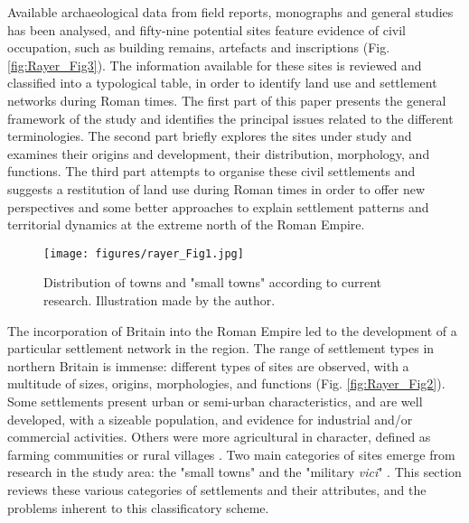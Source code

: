 	Available archaeological data from field reports, monographs and general studies has been analysed, and fifty-nine potential sites feature evidence of civil occupation, such as building remains, artefacts and inscriptions (Fig. \ref{fig:Rayer_Fig3}). The information available for these sites is reviewed and classified into a typological table, in order to identify land use and settlement networks during Roman times. 
The first part of this paper presents the general framework of the study and identifies the principal issues related to the different terminologies. The second part briefly explores the sites under study and examines their origins and development, their distribution, morphology, and functions. The third part attempts to organise these civil settlements and suggests a restitution of land use during Roman times in order to offer new perspectives and some better approaches to explain settlement patterns and territorial dynamics at the extreme north of the Roman Empire.
	
	\begin{figure}
		\texttt{[image: figures/rayer\_Fig1.jpg]}
		\caption{Distribution of towns and "small towns" according to current research. Illustration made by the author.}
		\label{fig:Rayer_Fig1}
	\end{figure}


The incorporation of Britain into the Roman Empire led to the development of a particular settlement network in the region. The range of settlement types in northern Britain is immense: different types of sites are observed, with a multitude of sizes, origins, morphologies, and functions (Fig. \ref{fig:Rayer_Fig2}). Some settlements present urban or semi-urban characteristics, and are well developed, with a sizeable population, and evidence for industrial and/or commercial activities. Others were more agricultural in character, defined as farming communities or rural villages \parencites{Hingley_1989}{James_2001}{Jones_1991}{Wacher_1995}. Two main categories of sites emerge from research in the study area: the "small towns" and the "military \emph{vici}" \parencites{Rodwell_1975}{Sommer_1984}{Sommer_2006}{Wacher_1995}. This section reviews these various categories of settlements and their attributes, and the problems inherent to this classificatory scheme. 

